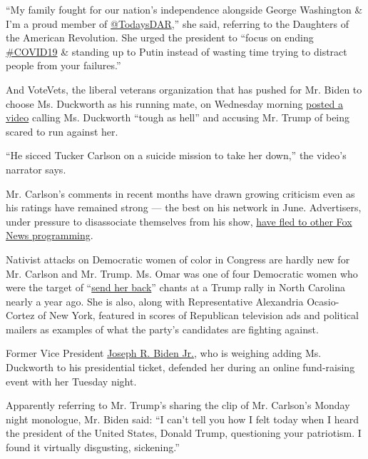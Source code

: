 ``My family fought for our nation's independence alongside George
Washington \& I'm a proud member of
\href{https://twitter.com/TodaysDAR}{@TodaysDAR},'' she said, referring
to the Daughters of the American Revolution. She urged the president to
``focus on ending
\href{https://twitter.com/hashtag/COVID19?src=hashtag_click}{\#COVID19}
\& standing up to Putin instead of wasting time trying to distract
people from your failures.''

And VoteVets, the liberal veterans organization that has pushed for Mr.
Biden to choose Ms. Duckworth as his running mate, on Wednesday morning
\href{https://www.youtube.com/watch?v=Rml8P9pXmXw}{posted a video}
calling Ms. Duckworth ``tough as hell'' and accusing Mr. Trump of being
scared to run against her.

``He sicced Tucker Carlson on a suicide mission to take her down,'' the
video's narrator says.

Mr. Carlson's comments in recent months have drawn growing criticism
even as his ratings have remained strong --- the best on his network in
June. Advertisers, under pressure to disassociate themselves from his
show,
\href{https://www.nytimes3xbfgragh.onion/2020/06/18/business/media/tucker-carlson-advertisers-ratings.html}{have
fled to other Fox News programming}.

Nativist attacks on Democratic women of color in Congress are hardly new
for Mr. Carlson and Mr. Trump. Ms. Omar was one of four Democratic women
who were the target of
``\href{https://www.nytimes3xbfgragh.onion/2019/07/17/us/politics/trump-send-her-back-ilhan-omar.html}{send
her back}'' chants at a Trump rally in North Carolina nearly a year ago.
She is also, along with Representative Alexandria Ocasio-Cortez of New
York, featured in scores of Republican television ads and political
mailers as examples of what the party's candidates are fighting against.

Former Vice President
\href{https://www.nytimes3xbfgragh.onion/interactive/2020/us/elections/joe-biden.html}{Joseph
R. Biden Jr.}, who is weighing adding Ms. Duckworth to his presidential
ticket, defended her during an online fund-raising event with her
Tuesday night.

Apparently referring to Mr. Trump's sharing the clip of Mr. Carlson's
Monday night monologue, Mr. Biden said: ``I can't tell you how I felt
today when I heard the president of the United States, Donald Trump,
questioning your patriotism. I found it virtually disgusting,
sickening.''

